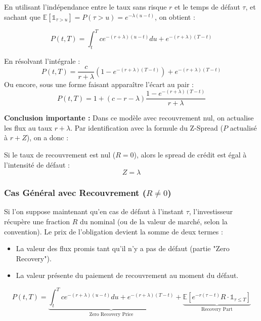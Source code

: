En utilisant l'indépendance entre le taux sans risque $r$ et le temps de défaut $\tau$, et sachant que $\mathbb{E}[\mathbb{1}_{\tau > u}] = P(\tau > u) = e^{-\lambda(u-t)}$, on obtient :

\begin{equation}
    P(t, T) = \int_t^T c e^{-(r+\lambda)(u-t)} du + e^{-(r+\lambda)(T-t)}
\end{equation}

En résolvant l'intégrale :
\begin{equation}
    P(t, T) = \frac{c}{r+\lambda} (1 - e^{-(r+\lambda)(T-t)}) + e^{-(r+\lambda)(T-t)}
\end{equation}
Ou encore, sous une forme faisant apparaître l'écart au pair :
\begin{equation}
    P(t, T) = 1 + (c - r - \lambda) \frac{1 - e^{-(r+\lambda)(T-t)}}{r+\lambda}
\end{equation}

\textbf{Conclusion importante :}
Dans ce modèle avec recouvrement nul, on actualise les flux au taux $r + \lambda$.
Par identification avec la formule du Z-Spread ($P$ actualisé à $r + Z$), on a donc :
\begin{tcolorbox}[colback=red!5!white,colframe=red!75!black,title=Relation Intensité - Spread]
    Si le taux de recouvrement est nul ($R=0$), alors le spread de crédit est égal à l'intensité de défaut :
    \begin{equation}
        Z = \lambda
    \end{equation}
\end{tcolorbox}

\subsubsection{Cas Général avec Recouvrement ($R \neq 0$)}

Si l'on suppose maintenant qu'en cas de défaut à l'instant $\tau$, l'investisseur récupère une fraction $R$ du nominal (ou de la valeur de marché, selon la convention).
Le prix de l'obligation devient la somme de deux termes :
\begin{itemize}
    \item La valeur des flux promis tant qu'il n'y a pas de défaut (partie "Zero Recovery").
    \item La valeur présente du paiement de recouvrement au moment du défaut.
\end{itemize}

\begin{equation}
    P(t, T) = \underbrace{\int_t^T c e^{-(r+\lambda)(u-t)} du + e^{-(r+\lambda)(T-t)}}_{\text{Zero Recovery Price}} + \underbrace{\mathbb{E} \left[ e^{-r(\tau-t)} R \cdot \mathbb{1}_{\tau \le T} \right]}_{\text{Recovery Part}}
\end{equation}

